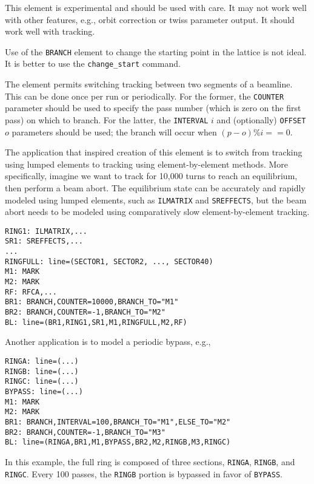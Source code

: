 This element is experimental and should be used with care.
It may not work well with other features, e.g., orbit correction or twiss parameter output.
It should work well with tracking.

Use of the \verb|BRANCH| element to change the starting point in the lattice is not ideal.
It is better to use the \verb|change_start| command.

The element permits switching tracking between two segments of a beamline. This can be done once per run
or periodically. For the former, the \verb|COUNTER| parameter should be used to specify the pass number (which
is zero on the first pass) on which to branch.
For the latter, the \verb|INTERVAL| $i$ and (optionally) \verb|OFFSET| $o$ parameters should be used; the branch will occur
when $(p-o) \% i == 0$.

The application that inspired creation of this element is to switch from tracking using lumped elements to tracking
using element-by-element methods.
More specifically, imagine we want to track for 10,000 turns to reach an equilibrium, then perform a beam abort.
The equilibrium state can be accurately and rapidly modeled using lumped elements, such as \verb|ILMATRIX| and \verb|SREFFECTS|,
but the beam abort needs to be modeled using comparatively slow element-by-element tracking.
\begin{verbatim}
RING1: ILMATRIX,...
SR1: SREFFECTS,...
...
RINGFULL: line=(SECTOR1, SECTOR2, ..., SECTOR40)
M1: MARK
M2: MARK
RF: RFCA,...
BR1: BRANCH,COUNTER=10000,BRANCH_TO="M1"
BR2: BRANCH,COUNTER=-1,BRANCH_TO="M2"
BL: line=(BR1,RING1,SR1,M1,RINGFULL,M2,RF)
\end{verbatim}

Another application is to model a periodic bypass, e.g.,
\begin{verbatim}
RINGA: line=(...)
RINGB: line=(...)
RINGC: line=(...)
BYPASS: line=(...)
M1: MARK
M2: MARK
BR1: BRANCH,INTERVAL=100,BRANCH_TO="M1",ELSE_TO="M2"
BR2: BRANCH,COUNTER=-1,BRANCH_TO="M3"
BL: line=(RINGA,BR1,M1,BYPASS,BR2,M2,RINGB,M3,RINGC)
\end{verbatim}
In this example, the full ring is composed of three sections, \verb|RINGA|, \verb|RINGB|, and \verb|RINGC|.
Every 100 passes, the \verb|RINGB| portion is bypassed in favor of \verb|BYPASS|.

